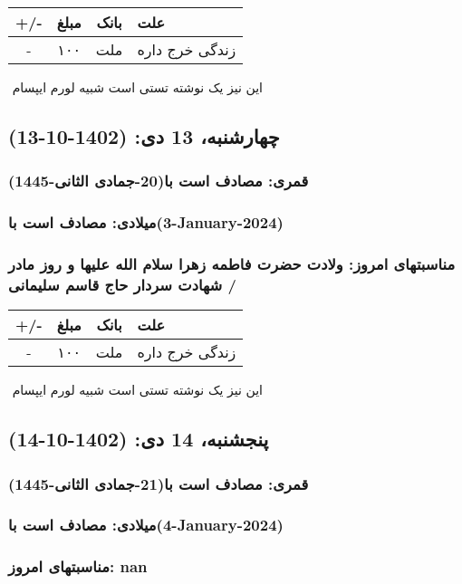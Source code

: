 \documentclass{article}
\newcommand{\rnote}[1]{\marginpar{\textcolor{color}{\StrSubstitute{\##1}{ }{\_}}}}
\newcommand{\myRow}[4]{
    #1 & #2 & #3 & #4 \\ \hline
}
\begin{document}
\begin{tabular}{ | c | c | c | p{5cm} |}
    \hline
    \myRow{ +/- }{مبلغ}{بانک}{علت}
    \myRow{-}{۱۰۰}{ملت}{زندگی خرج داره}
\end{tabular}
\newline
\newline

‌
\rnote{تست}
این نیز یک نوشته تستی است شبیه لورم ایپسام




\newpage
{}
\textcolor{color}{
\section{ چهارشنبه، 13 دی: (1402-10-13) }
\subsubsection*{قمری: مصادف است با(20-جمادی الثانی-1445)} 
\subsubsection*{میلادی: مصادف است با(3-January-2024)}
\subsubsection*{مناسبتهای امروز: ولادت حضرت فاطمه زهرا سلام الله علیها و روز مادر / شهادت سردار حاج قاسم سلیمانی}
}


\begin{tabular}{ | c | c | c | p{5cm} |}
    \hline
    \myRow{ +/- }{مبلغ}{بانک}{علت}
    \myRow{-}{۱۰۰}{ملت}{زندگی خرج داره}
\end{tabular}
\newline
\newline

‌
\rnote{تست}
این نیز یک نوشته تستی است شبیه لورم ایپسام




\newpage
{}
\textcolor{color}{
\section{ پنجشنبه، 14 دی: (1402-10-14) }
\subsubsection*{قمری: مصادف است با(21-جمادی الثانی-1445)} 
\subsubsection*{میلادی: مصادف است با(4-January-2024)}
\subsubsection*{مناسبتهای امروز: nan}
}
\end{document}
